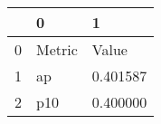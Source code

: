 \begin{tabular}{lll}
\toprule
 & 0 & 1 \\
\midrule
0 & Metric & Value \\
1 & ap & 0.401587 \\
2 & p10 & 0.400000 \\
\bottomrule
\end{tabular}
